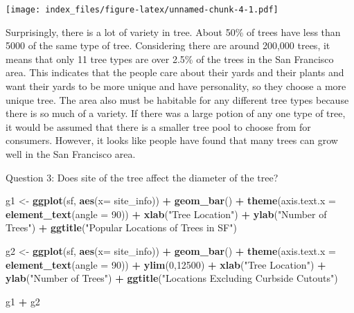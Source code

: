 \documentclass[
]{article}
\newenvironment{Shaded}{\begin{snugshade}}{\end{snugshade}}
\newcommand{\DataTypeTok}[1]{\textcolor[rgb]{0.13,0.29,0.53}{#1}}
\newcommand{\DecValTok}[1]{\textcolor[rgb]{0.00,0.00,0.81}{#1}}
\newcommand{\KeywordTok}[1]{\textcolor[rgb]{0.13,0.29,0.53}{\textbf{#1}}}
\newcommand{\NormalTok}[1]{#1}
\newcommand{\OperatorTok}[1]{\textcolor[rgb]{0.81,0.36,0.00}{\textbf{#1}}}
\newcommand{\StringTok}[1]{\textcolor[rgb]{0.31,0.60,0.02}{#1}}
\begin{document}
\texttt{[image: index\_files/figure-latex/unnamed-chunk-4-1.pdf]}

Surprisingly, there is a lot of variety in tree. About 50\% of trees
have less than 5000 of the same type of tree. Considering there are
around 200,000 trees, it means that only 11 tree types are over 2.5\% of
the trees in the San Francisco area. This indicates that the people care
about their yards and their plants and want their yards to be more
unique and have personality, so they choose a more unique tree. The area
also must be habitable for any different tree types because there is so
much of a variety. If there was a large potion of any one type of tree,
it would be assumed that there is a smaller tree pool to choose from for
consumers. However, it looks like people have found that many trees can
grow well in the San Francisco area.

Question 3: Does site of the tree affect the diameter of the tree?

\begin{Shaded}
\begin{Highlighting}[]
\NormalTok{g1 <-}\StringTok{ }\KeywordTok{ggplot}\NormalTok{(sf, }\KeywordTok{aes}\NormalTok{(}\DataTypeTok{x=}\NormalTok{ site_info)) }\OperatorTok{+}
\StringTok{  }\KeywordTok{geom_bar}\NormalTok{() }\OperatorTok{+}
\StringTok{  }\KeywordTok{theme}\NormalTok{(}\DataTypeTok{axis.text.x =} \KeywordTok{element_text}\NormalTok{(}\DataTypeTok{angle =} \DecValTok{90}\NormalTok{)) }\OperatorTok{+}
\StringTok{  }\KeywordTok{xlab}\NormalTok{(}\StringTok{"Tree Location"}\NormalTok{) }\OperatorTok{+}
\StringTok{  }\KeywordTok{ylab}\NormalTok{(}\StringTok{"Number of Trees"}\NormalTok{) }\OperatorTok{+}
\StringTok{  }\KeywordTok{ggtitle}\NormalTok{(}\StringTok{"Popular Locations of Trees in SF"}\NormalTok{)}

\NormalTok{g2 <-}\StringTok{ }\KeywordTok{ggplot}\NormalTok{(sf, }\KeywordTok{aes}\NormalTok{(}\DataTypeTok{x=}\NormalTok{ site_info)) }\OperatorTok{+}
\StringTok{  }\KeywordTok{geom_bar}\NormalTok{() }\OperatorTok{+}
\StringTok{  }\KeywordTok{theme}\NormalTok{(}\DataTypeTok{axis.text.x =} \KeywordTok{element_text}\NormalTok{(}\DataTypeTok{angle =} \DecValTok{90}\NormalTok{)) }\OperatorTok{+}\StringTok{ }
\StringTok{  }\KeywordTok{ylim}\NormalTok{(}\DecValTok{0}\NormalTok{,}\DecValTok{12500}\NormalTok{) }\OperatorTok{+}
\StringTok{  }\KeywordTok{xlab}\NormalTok{(}\StringTok{"Tree Location"}\NormalTok{) }\OperatorTok{+}
\StringTok{  }\KeywordTok{ylab}\NormalTok{(}\StringTok{"Number of Trees"}\NormalTok{) }\OperatorTok{+}
\StringTok{  }\KeywordTok{ggtitle}\NormalTok{(}\StringTok{"Locations Excluding Curbside Cutouts"}\NormalTok{)}

\NormalTok{g1 }\OperatorTok{+}\StringTok{ }\NormalTok{g2}
\end{Highlighting}
\end{Shaded}
\end{document}
